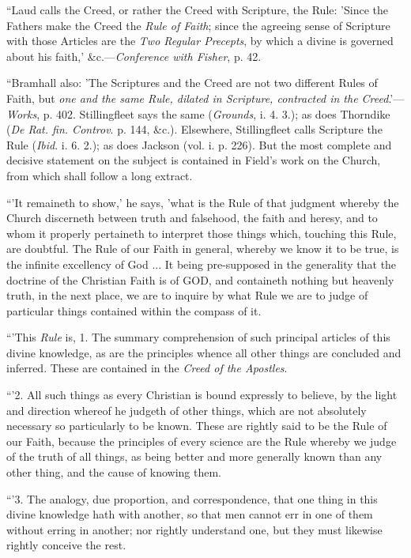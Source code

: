 ``Laud calls the Creed, or rather the Creed with Scripture, the
Rule: 'Since the Fathers make the Creed the \emph{Rule of Faith};
since the agreeing sense of Scripture with those Articles are the \emph{Two
Regular Precepts}, by which a divine is governed about his faith,'
\&c.—\emph{Conference with Fisher}, p. 42.

``Bramhall also: 'The Scriptures and the Creed are not two
different Rules of Faith, but \emph{one and the same Rule, dilated in
Scripture, contracted in the Creed}.'—\emph{Works}, p. 402.
Stillingfleet says the same (\emph{Grounds}, i. 4. 3.); as does
Thorndike (\emph{De Rat. fin. Controv}. p. 144, \&c.). Elsewhere,
Stillingfleet calls Scripture the Rule (\emph{Ibid}. i. 6. 2.); as does
Jackson (vol. i. p. 226). But the most complete and decisive statement
on the subject is contained in Field's work on the Church, from which
shall follow a long extract.

``'It remaineth to show,' he says, 'what is the
Rule of that judgment whereby the Church discerneth between truth and
falsehood, the faith and heresy, and to whom it properly pertaineth to
interpret those things which, touching this Rule, are doubtful. The
Rule of our Faith in general, whereby we know it to be true, is the
infinite excellency of God ... It being pre-supposed in the generality
that the doctrine of the Christian Faith is of GOD,
and containeth nothing but heavenly truth, in the next place, we are
to inquire by what Rule we are to judge of particular things contained
within the compass of it.

``'This \emph{Rule} is, 1. The summary
comprehension of such principal articles of this divine knowledge, as
are the principles whence all other things are concluded and
inferred. These are contained in the \emph{Creed of the Apostles}.

``'2. All such things as every Christian is
bound expressly to believe, by the light and direction whereof he
judgeth of other things, which are not absolutely necessary so
particularly to be known. These are rightly said to be the Rule of our
Faith, because the principles of every science are the Rule whereby we
judge of the truth of all things, as being better and more generally
known than any other thing, and the cause of knowing them.

``'3. The analogy, due proportion, and
correspondence, that one thing in this divine knowledge hath with
another, so that men cannot err in one of them without erring in
another; nor rightly understand one, but they must likewise rightly
conceive the rest.

